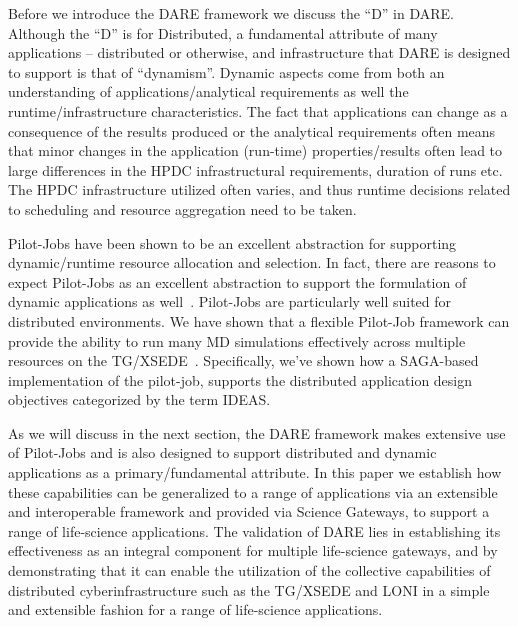 \documentclass[]{svjour3}
\begin{document}
Before we introduce the DARE framework we discuss the ``D'' in
DARE. Although the ``D'' is for Distributed, a fundamental attribute
of many applications -- distributed or otherwise, and infrastructure
that DARE is designed to support is that of ``dynamism''.  Dynamic
aspects come from both an understanding of applications/analytical
requirements as well the runtime/infrastructure characteristics.  The
fact that applications can change as a consequence of the results
produced or the analytical requirements often means that minor changes
in the application (run-time) properties/results often lead to large
differences in the HPDC infrastructural requirements, duration of runs
etc.  The HPDC infrastructure utilized often varies, and thus runtime
decisions related to scheduling and resource aggregation need to be
taken.

Pilot-Jobs have been shown to be an excellent abstraction for
supporting dynamic/runtime resource allocation and selection.  In
fact, there are reasons to expect Pilot-Jobs as an excellent
abstraction to support the formulation of dynamic applications as
well~\cite{pstar11}.  Pilot-Jobs are particularly well suited for
distributed environments.  We have shown that a flexible Pilot-Job
framework can provide the ability to run many MD simulations
effectively across multiple resources on the
TG/XSEDE~\cite{saga-royalsoc,saga_bigjob_condor_cloud}.  Specifically,
we've shown how a SAGA-based implementation of the pilot-job, supports
the distributed application design objectives categorized by the term
IDEAS\cite{ideas}.

As we will discuss in the next section, the DARE framework makes
extensive use of Pilot-Jobs and is also designed to support
distributed and dynamic applications as a primary/fundamental
attribute.  In this paper we establish how these capabilities can be
generalized to a range of applications via an extensible and
interoperable framework and provided via Science Gateways, to support
a range of life-science applications.  The validation of DARE lies in
establishing its effectiveness as an integral component for multiple
life-science gateways, and by demonstrating that it can enable the
utilization of the collective capabilities of distributed
cyberinfrastructure such as the TG/XSEDE and LONI in a simple and
extensible fashion for a range of life-science applications.
\end{document}
